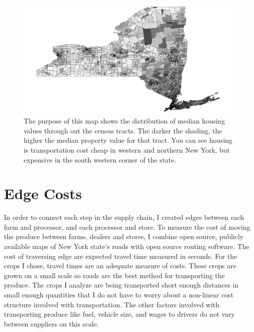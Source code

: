 \documentclass{report}
\begin{document}
\begin{figure}
\centering
\begin{framed}
\includegraphics[scale=.50]{map_4}
\caption{The purpose of this map shows the distribution of median housing values through out the census tracts. The darker the shading, the higher the median property value for that tract. You can see housing is transportation cost cheap in western and northern New York, but expensive in the south western corner of the state.}
\label{fig:map_4}
\end{framed}
\end{figure}

\section{Edge Costs}

In order to connect each step in the supply chain, I created edges between each farm and processor, and each processor and store. To measure the cost of moving the produce between farms, dealers and stores, I combine open source, publicly available maps of New York state's roads with open source routing software. The cost of traversing edge are expected travel time measured in seconds. For the crops I chose, travel times are an adequate measure of costs. These crops are grown on a small scale so roads are the best method for transporting the produce. The crops I analyze are being transported short enough distances in small enough quantities that I do not have to worry about a non-linear cost structure involved with transportation. The other factors involved with transporting produce like fuel, vehicle size, and wages to drivers do not vary between suppliers on this scale. 
\end{document}
